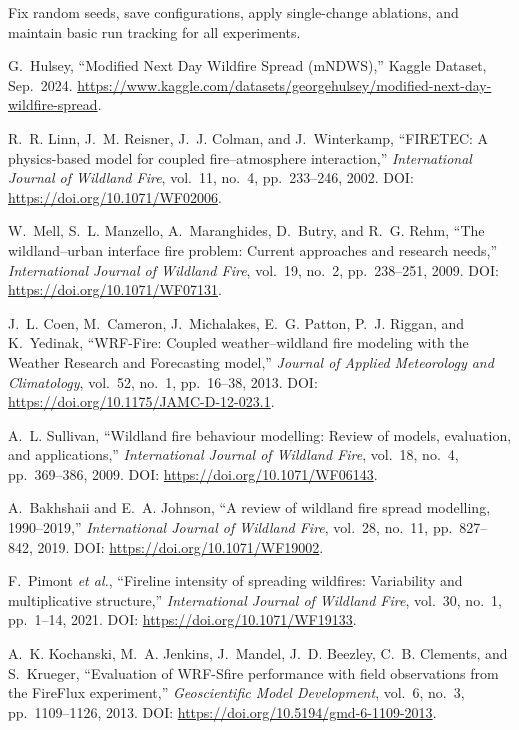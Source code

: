 \documentclass[conference]{IEEEtran}
\begin{document}
\noindent{} Fix random seeds, save configurations, apply single-change ablations, and maintain basic run tracking for all experiments.

\begin{thebibliography}{00}

G.~Hulsey, ``Modified Next Day Wildfire Spread (mNDWS),'' Kaggle Dataset, Sep.~2024. \url{https://www.kaggle.com/datasets/georgehulsey/modified-next-day-wildfire-spread}.

R.~R. Linn, J.~M. Reisner, J.~J. Colman, and J.~Winterkamp,
``FIRETEC: A physics-based model for coupled fire--atmosphere interaction,''
\emph{International Journal of Wildland Fire}, vol.~11, no.~4, pp.~233--246, 2002. DOI: \url{https://doi.org/10.1071/WF02006}.

W.~Mell, S.~L. Manzello, A.~Maranghides, D.~Butry, and R.~G. Rehm,
``The wildland--urban interface fire problem: Current approaches and research needs,''
\emph{International Journal of Wildland Fire}, vol.~19, no.~2, pp.~238--251, 2009. DOI: \url{https://doi.org/10.1071/WF07131}.

J.~L. Coen, M.~Cameron, J.~Michalakes, E.~G. Patton, P.~J. Riggan, and K.~Yedinak,
``WRF-Fire: Coupled weather--wildland fire modeling with the Weather Research and Forecasting model,''
\emph{Journal of Applied Meteorology and Climatology}, vol.~52, no.~1, pp.~16--38, 2013. DOI: \url{https://doi.org/10.1175/JAMC-D-12-023.1}.

A.~L. Sullivan,
``Wildland fire behaviour modelling: Review of models, evaluation, and applications,''
\emph{International Journal of Wildland Fire}, vol.~18, no.~4, pp.~369--386, 2009. DOI: \url{https://doi.org/10.1071/WF06143}.

A.~Bakhshaii and E.~A. Johnson,
``A review of wildland fire spread modelling, 1990--2019,''
\emph{International Journal of Wildland Fire}, vol.~28, no.~11, pp.~827--842, 2019. DOI: \url{https://doi.org/10.1071/WF19002}.

F.~Pimont \emph{et al.},
``Fireline intensity of spreading wildfires: Variability and multiplicative structure,''
\emph{International Journal of Wildland Fire}, vol.~30, no.~1, pp.~1--14, 2021. DOI: \url{https://doi.org/10.1071/WF19133}.

A.~K. Kochanski, M.~A. Jenkins, J.~Mandel, J.~D. Beezley, C.~B. Clements, and S.~Krueger,
``Evaluation of WRF-Sfire performance with field observations from the FireFlux experiment,''
\emph{Geoscientific Model Development}, vol.~6, no.~3, pp.~1109--1126, 2013. DOI: \url{https://doi.org/10.5194/gmd-6-1109-2013}.


\end{thebibliography}
\end{document}
